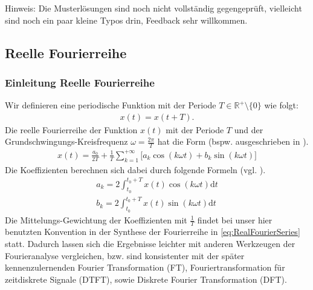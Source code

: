\documentclass[11pt,a4paper,DIV=12]{scrartcl}
\newcommand{\diff}{\mathrm{d}}
\begin{document}
Hinweis: Die Musterlösungen sind noch nicht vollständig gegengeprüft, vielleicht
sind noch ein paar kleine Typos drin, Feedback sehr willkommen.
\newpage
\subsection*{Reelle Fourierreihe}
\subsubsection*{Einleitung Reelle Fourierreihe}
%
Wir definieren eine periodische Funktion mit der Periode
%
$T\in\mathbb{R}^+\setminus\{0\}$
%
wie folgt:
%
\begin{align}
	x(t)=x(t+T).
\end{align}
%
Die reelle Fourierreihe der Funktion $x(t)$ mit der Periode $T$ und der
Grundschwingungs-Kreisfrequenz $\omega=\frac{2\pi}{T}$ hat die Form (bspw. ausgeschrieben in
\cite[Kap. 7, S. 474]{Bronstein2015}).
%
\begin{align}
	\label{eq:RealFourierSeries}
	x(t)=\frac{a_0}{2T}+\frac{1}{T}\sum_{k=1}^{+\infty}\big[ a_k\cos(k\omega t)+b_k\sin(k\omega t)\big]
\end{align}
%
Die Koeffizienten berechnen sich dabei durch folgende Formeln
(vgl. \cite[Kap. 7, S. 474]{Bronstein2015}).
%
\begin{gather}
	\label{eq:Koeff}
	a_k=2\int_{t_0}^{t_0+T}x(t)\cos(k\omega t)\diff t \\
	b_k=2\int_{t_0}^{t_0+T}x(t)\sin(k\omega t)\diff t
\end{gather}
%
Die Mittelungs-Gewichtung der Koeffizienten mit $\frac{1}{T}$ findet bei
unser hier benutzten Konvention in der
Synthese der Fourierreihe in \eqref{eq:RealFourierSeries} statt.
%
Dadurch lassen sich die Ergebnisse leichter mit anderen Werkzeugen
der Fourieranalyse vergleichen, bzw. sind konsistenter mit der
später kennenzulernenden Fourier Transformation (FT), Fouriertransformation für
zeitdiskrete Signale (DTFT), sowie Diskrete Fourier Transformation (DFT).
%
\end{document}
